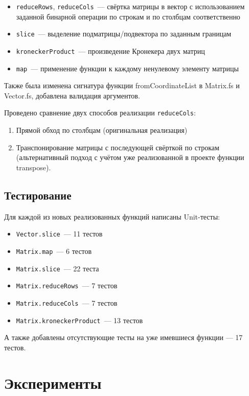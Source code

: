\documentclass[a4paper]{article}
\begin{document}
\begin{itemize}
    \item \texttt{reduceRows}, \texttt{reduceCols}~--- свёртка матрицы в вектор с использованием заданной бинарной операции по строкам и по столбцам соответственно
    \item \texttt{slice}~--- выделение подматрицы/подвектора по заданным границам
    \item \texttt{kroneckerProduct}~--- произведение Кронекера двух матриц
    \item \texttt{map}~--- применение функции к каждому ненулевому элементу матрицы
\end{itemize}

Также была изменена сигнатура функции fromCoordinateList в Matrix.fs и Vector.fs, добавлена валидация аргументов.

Проведено сравнение двух способов реализации \texttt{reduceCols}:
\begin{enumerate}
    \item Прямой обход по столбцам (оригинальная реализация)
    \item Транспонирование матрицы с последующей свёрткой по строкам (альтернативный подход с учётом уже реализованной в проекте функции transpose).
\end{enumerate}

\subsection{Тестирование}

Для каждой из новых реализованных функций написаны Unit-тесты:
\begin{itemize}
    \item \texttt{Vector.slice}~--- 11 тестов
    \item \texttt{Matrix.map}~--- 6 тестов
    \item \texttt{Matrix.slice}~--- 22 теста
    \item \texttt{Matrix.reduceRows}~--- 7 тестов
    \item \texttt{Matrix.reduceCols}~--- 7 тестов
    \item \texttt{Matrix.kroneckerProduct}~--- 13 тестов
\end{itemize}
А также добавлены отсутствующие тесты на уже имевшиеся функции --- 17 тестов.

\section{Эксперименты}
\end{document}
